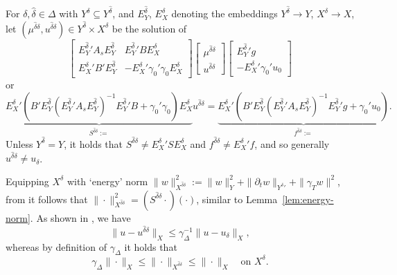 \documentclass[11pt,a4paper,oneside,english]{amsart}
\numberwithin{equation}{section}
\numberwithin{theorem}{section}
\theoremstyle{definition}
\newcommand{\rvv}[1]{{\color{teal}{RvV: #1}}}
\begin{document}
For $\delta, \hat{\delta} \in \Delta$ with $Y^\delta \subseteq Y^{\hat{\delta}}$, and
$E_Y^{\hat{\delta}}$, $E_X^\delta$ denoting the embeddings $Y^{\hat{\delta}} \rightarrow Y$,
$X^\delta \rightarrow X$, let $(\mu^{\hat{\delta} \delta},u^{\hat{\delta} \delta}) \in Y^{\hat{\delta}} \times X^\delta$ be the solution of
\[
  \begin{bmatrix}{E_Y^{\hat{\delta}}}' A_s E_Y^{\hat{\delta}}& {E_Y^{\hat{\delta}}}' B E^\delta_X\\ {E^\delta_X}' B' E_Y^{\hat{\delta}}& -{E^\delta_X}' \gamma_0' \gamma_0 E^\delta_X \end{bmatrix}
  \begin{bmatrix} \mu^{\hat{\delta} \delta} \\ u^{\hat{\delta} \delta} \end{bmatrix}
  \begin{bmatrix} {E^{\hat{\delta}}_Y}' g \\ -{E^\delta_X}' \gamma_0' u_0 \end{bmatrix}
\]
or
\begin{equation}
  \label{eqn:discr-schur}
  \underbrace{
    {E^\delta_X}'(B' E^{\hat{\delta}}_Y({E^{\hat{\delta}}_Y}' A_s E^{\hat{\delta}}_Y)^{-1} {E^{\hat{\delta}}_Y}' B +\gamma_0'\gamma_0)E^\delta_X
  }_{S^{\hat{\delta} \delta}:=}u^{\hat{\delta} \delta}
  =
  \underbrace{
    {E^\delta_X}' (B' E^{\hat{\delta}}_Y({E^{\hat{\delta}}_Y}' A_s E^{\hat{\delta}}_Y)^{-1} {E^{\hat{\delta}}_Y}' g+\gamma_0' u_0)
  }_{f^{\hat{\delta} \delta}:=}.
\end{equation}\rvv{heavy notatie uitstellen?}
Unless $Y^{\hat{\delta}}=Y$, it holds that $S^{\hat{\delta} \delta} \neq {E_X^\delta}' S E_X^\delta$ and $f^{\hat{\delta} \delta} \neq {E_X^\delta}'f$, and so generally $u^{\hat{\delta} \delta} \neq u_\delta$.

Equipping $X^\delta$ with `energy' norm $\|w\|^2_{X^{\hat{\delta}\delta}}:=\|w\|^2_{Y}+ \|\partial_t w\|_{{Y^\delta}'}+\|\gamma_T w\|^2$,
from \cite[Lemma~3.4]{Stevenson2020a} it follows that
$\|\cdot\|_{X^{\hat{\delta}\delta}}^2=(S^{\hat{\delta}\delta}\cdot)(\cdot)$,
similar to Lemma~\ref{lem:energy-norm}. As shown in \cite[Thm.~3.7]{Stevenson2020a}, we have
\begin{equation}
  \label{eqn:galerkin-ortho}
  \|u-u^{\hat{\delta}\delta}\|_X \leq \gamma_\Delta^{-1} \|u-u_\delta\|_X,
\end{equation}
whereas by definition of $\gamma_\Delta$ it holds that
\begin{equation}
  \label{eqn:X-norm-equiv}
  \gamma_\Delta\|\cdot\|_{X} \leq \|\cdot\|_{X^{\hat{\delta}\delta}} \leq \|\cdot\|_{X} \quad\text{on } X^\delta.
\end{equation}
\end{document}
